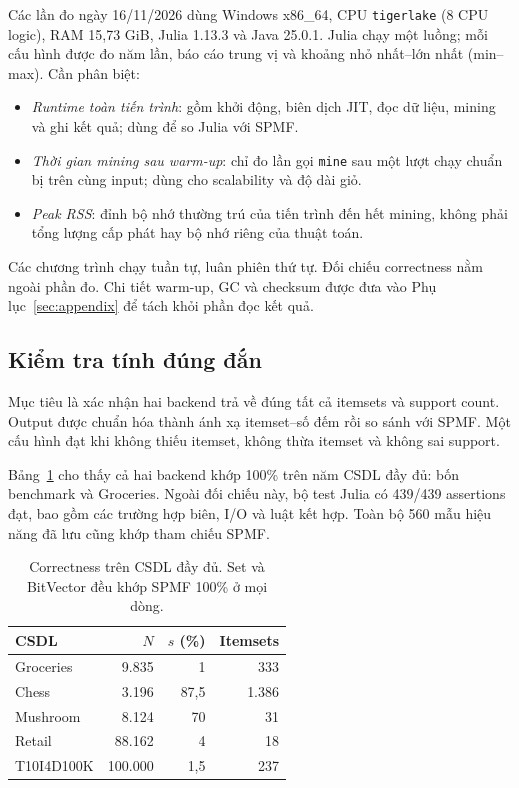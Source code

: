 Các lần đo ngày 16/11/2026 dùng Windows x86\_64, CPU \texttt{tigerlake}
(8 CPU logic), RAM 15,73 GiB, Julia 1.13.3 và Java 25.0.1.
Julia chạy một luồng; mỗi cấu hình được đo năm lần, báo cáo trung vị
và khoảng nhỏ nhất--lớn nhất (min--max). Cần phân biệt:
\begin{itemize}
\item \emph{Runtime toàn tiến trình}: gồm khởi động, biên dịch JIT, đọc dữ
liệu, mining và ghi kết quả; dùng để so Julia với SPMF.
\item \emph{Thời gian mining sau warm-up}: chỉ đo lần gọi \texttt{mine}
sau một lượt chạy chuẩn bị trên cùng input; dùng cho scalability và độ dài giỏ.
\item \emph{Peak RSS}: đỉnh bộ nhớ thường trú của tiến trình đến hết mining,
không phải tổng lượng cấp phát hay bộ nhớ riêng của thuật toán.
\end{itemize}
Các chương trình chạy tuần tự, luân phiên thứ tự. Đối chiếu correctness
nằm ngoài phần đo. Chi tiết warm-up, GC và checksum được đưa vào
Phụ lục~\ref{sec:appendix} để tách khỏi phần đọc kết quả.

\subsection{Kiểm tra tính đúng đắn}
Mục tiêu là xác nhận hai backend trả về đúng tất cả itemsets và support count.
Output được chuẩn hóa thành ánh xạ itemset--số đếm rồi so sánh với SPMF.
Một cấu hình đạt khi không thiếu itemset, không thừa itemset và không sai support.

Bảng~\ref{tab:correct} cho thấy cả hai backend khớp 100\% trên năm CSDL đầy đủ:
bốn benchmark và Groceries. Ngoài đối chiếu này, bộ test Julia có 439/439
assertions đạt, bao gồm các trường hợp biên, I/O và luật kết hợp.
Toàn bộ 560 mẫu hiệu năng đã lưu cũng khớp tham chiếu SPMF.

\begin{table}[!ht]\caption{Correctness trên CSDL đầy đủ. Set và BitVector đều khớp SPMF 100\% ở mọi dòng.}\label{tab:correct}\centering\small
\begin{tabular}{lrrr}\toprule CSDL & $N$ & $s$ (\%) & Itemsets\\\midrule
Groceries & 9.835 & 1 & 333\\ Chess & 3.196 & 87,5 & 1.386\\
Mushroom & 8.124 & 70 & 31\\ Retail & 88.162 & 4 & 18\\
T10I4D100K & 100.000 & 1,5 & 237\\\bottomrule\end{tabular}\end{table}

